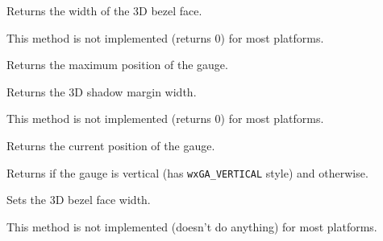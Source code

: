 
Returns the width of the 3D bezel face.


This method is not implemented (returns $0$) for most platforms.




\label{wxgaugegetrange}


Returns the maximum position of the gauge.




\label{wxgaugegetshadowwidth}


Returns the 3D shadow margin width.


This method is not implemented (returns $0$) for most platforms.




\label{wxgaugegetvalue}


Returns the current position of the gauge.




\label{wxgaugeisvertical}


Returns \true if the gauge is vertical (has \texttt{wxGA\_VERTICAL} style) and 
\false otherwise.


\label{wxgaugesetbezelface}


Sets the 3D bezel face width.


This method is not implemented (doesn't do anything) for most platforms.

